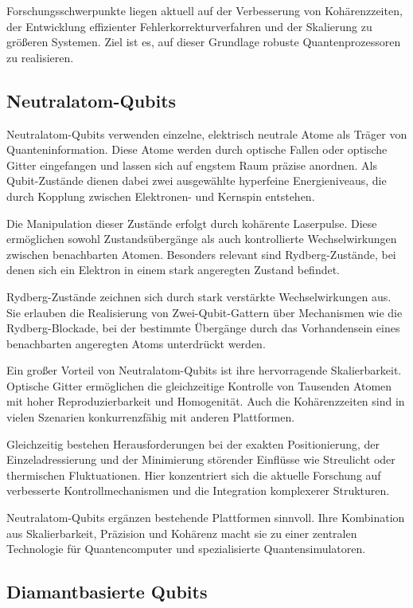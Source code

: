 Forschungsschwerpunkte liegen aktuell auf der Verbesserung von Kohärenzzeiten, der Entwicklung effizienter Fehlerkorrekturverfahren und der Skalierung zu größeren Systemen. Ziel ist es, auf dieser Grundlage robuste Quantenprozessoren zu realisieren.

\subsection{Neutralatom-Qubits}
Neutralatom-Qubits verwenden einzelne, elektrisch neutrale Atome als Träger von Quanteninformation. Diese Atome werden durch optische Fallen oder optische Gitter eingefangen und lassen sich auf engstem Raum präzise anordnen. Als Qubit-Zustände dienen dabei zwei ausgewählte hyperfeine Energieniveaus, die durch Kopplung zwischen Elektronen- und Kernspin entstehen.

Die Manipulation dieser Zustände erfolgt durch kohärente Laserpulse. Diese ermöglichen sowohl Zustandsübergänge als auch kontrollierte Wechselwirkungen zwischen benachbarten Atomen. Besonders relevant sind Rydberg-Zustände, bei denen sich ein Elektron in einem stark angeregten Zustand befindet.

Rydberg-Zustände zeichnen sich durch stark verstärkte Wechselwirkungen aus. Sie erlauben die Realisierung von Zwei-Qubit-Gattern über Mechanismen wie die Rydberg-Blockade, bei der bestimmte Übergänge durch das Vorhandensein eines benachbarten angeregten Atoms unterdrückt werden.

Ein großer Vorteil von Neutralatom-Qubits ist ihre hervorragende Skalierbarkeit. Optische Gitter ermöglichen die gleichzeitige Kontrolle von Tausenden Atomen mit hoher Reproduzierbarkeit und Homogenität. Auch die Kohärenzzeiten sind in vielen Szenarien konkurrenzfähig mit anderen Plattformen.

Gleichzeitig bestehen Herausforderungen bei der exakten Positionierung, der Einzeladressierung und der Minimierung störender Einflüsse wie Streulicht oder thermischen Fluktuationen. Hier konzentriert sich die aktuelle Forschung auf verbesserte Kontrollmechanismen und die Integration komplexerer Strukturen.

Neutralatom-Qubits ergänzen bestehende Plattformen sinnvoll. Ihre Kombination aus Skalierbarkeit, Präzision und Kohärenz macht sie zu einer zentralen Technologie für Quantencomputer und spezialisierte Quantensimulatoren.





\subsection{Diamantbasierte Qubits}

